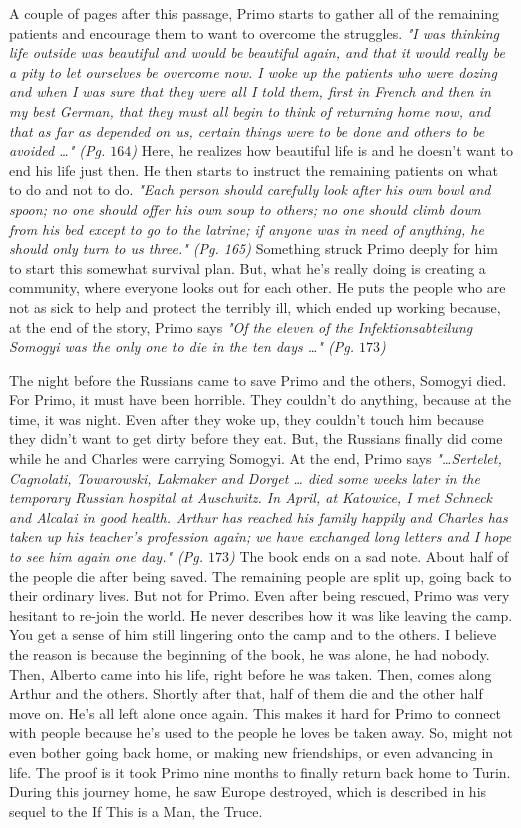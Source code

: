 A couple of pages after this passage, Primo starts to gather all of the
remaining patients and encourage them to want to overcome the struggles.
\textit{"I was thinking life outside was beautiful and would be beautiful
again, and that it would really be a pity to let ourselves be overcome now. I
woke up the patients who were dozing and when I was sure that they were all I
told them, first in French and then in my best German, that they must all
begin to think of returning home now, and that as far as depended on us,
certain things were to be done and others to be avoided \ldots" (Pg. $164$)}
Here, he realizes how beautiful life is and he doesn't want to end his life
just then. He then starts to instruct the remaining patients on what to do and
not to do. \textit{"Each person should carefully look after his own bowl and
spoon; no one should offer his own soup to others; no one should climb down
from his bed except to go to the latrine; if anyone was in need of anything,
he should only turn to us three." (Pg. 165)} Something struck Primo deeply
for him to start this somewhat survival plan. But, what he's really doing is
creating a community, where everyone looks out for each other. He puts the
people who are not as sick to help and protect the terribly ill, which ended
up working because, at the end of the story, Primo says \textit{"Of the
eleven of the Infektionsabteilung Somogyi was the only one to die in the
ten days \ldots" (Pg. $173$)}

The night before the Russians came to save Primo and the others, Somogyi died.
For Primo, it must have been horrible. They couldn't do anything, because at
the time, it was night. Even after they woke up, they couldn't touch him
because they didn't want to get dirty before they eat. But, the Russians
finally did come while he and Charles were carrying Somogyi. At the end, Primo
says \textit{"\ldots Sertelet, Cagnolati, Towarowski, Lakmaker and Dorget \ldots
died some weeks later in the temporary Russian hospital at Auschwitz. In April,
at Katowice, I met Schneck and Alcalai in good health. Arthur has reached his
family happily and Charles has taken up his teacher's profession again; we have
exchanged long letters and I hope to see him again one day." (Pg. $173$)} The
book ends on a sad note. About half of the people die after being saved. The
remaining people are split up, going back to their ordinary lives. But not for
Primo. Even after being rescued, Primo was very hesitant to re-join the world.
He never describes how it was like leaving the camp. You get a sense of him
still lingering onto the camp and to the others. I believe the reason is
because the beginning of the book, he was alone, he had nobody. Then, Alberto
came into his life, right before he was taken. Then, comes along Arthur and the
others. Shortly after that, half of them die and the other half move on. He's
all left alone once again. This makes it hard for Primo to connect with people
because he's used to the people he loves be taken away. So, might not even
bother going back home, or making new friendships, or even advancing in life.
The proof is it took Primo nine months to finally return back home to Turin.
During this journey home, he saw Europe destroyed, which is described in his
sequel to the If This is a Man, the Truce.
